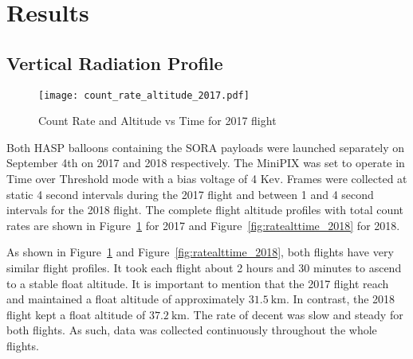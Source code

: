 \section{Results}
\label{Results}

\subsection{Vertical Radiation Profile}

\begin{figure}[H]
\centering
\texttt{[image: count\_rate\_altitude\_2017.pdf]}
\caption{Count Rate and Altitude vs Time for 2017 flight}
\label{fig:ratealttime_2017}
\end{figure}

Both HASP balloons containing the SORA payloads were launched separately on September 4th on 2017 and 2018 respectively.  The MiniPIX was set to operate in Time over Threshold mode with a bias voltage of 4 Kev.  Frames were collected at static 4 second intervals during the 2017 flight and between 1 and 4 second intervals for the 2018 flight.  The complete flight altitude profiles with total count rates are shown in Figure~\ref{fig:ratealttime_2017} for 2017 and Figure~\ref{fig:ratealttime_2018} for 2018.

As shown in Figure~\ref{fig:ratealttime_2017} and Figure~\ref{fig:ratealttime_2018}, both flights have very similar flight profiles.  It took each flight about 2 hours and 30 minutes to ascend to a stable float altitude.  It is important to mention that the 2017 flight reach and maintained a float altitude of approximately $\SI{31.5}{\kilo\meter}$.  In contrast, the 2018 flight kept a float altitude of $\SI{37.2}{\kilo\meter}$.  The rate of decent was slow and steady for both flights.  As such, data was collected continuously throughout the whole flights.

